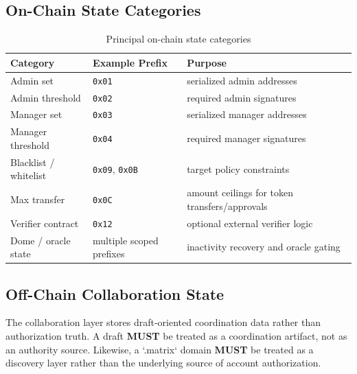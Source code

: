 \documentclass[11pt]{article}
\newcommand{\code}[1]{\texttt{#1}}
\newcommand{\must}{\textbf{MUST}}
\begin{document}
\subsection{On-Chain State Categories}
\begin{table}[h!]
  \centering
  \caption{Principal on-chain state categories}
  \begin{tabularx}{\textwidth}{>{\raggedright\arraybackslash}p{}>{\raggedright\arraybackslash}p{}X}
    \toprule
    Category & Example Prefix & Purpose \\
    \midrule
    Admin set & \code{0x01} & serialized admin addresses \\
    Admin threshold & \code{0x02} & required admin signatures \\
    Manager set & \code{0x03} & serialized manager addresses \\
    Manager threshold & \code{0x04} & required manager signatures \\
    Blacklist / whitelist & \code{0x09}, \code{0x0B} & target policy constraints \\
    Max transfer & \code{0x0C} & amount ceilings for token transfers/approvals \\
    Verifier contract & \code{0x12} & optional external verifier logic \\
    Dome / oracle state & multiple scoped prefixes & inactivity recovery and oracle gating \\
    \bottomrule
  \end{tabularx}
\end{table}

\subsection{Off-Chain Collaboration State}
The collaboration layer stores draft-oriented coordination data rather than authorization truth. A draft \must{} be treated as a coordination artifact, not as an authority source. Likewise, a `.matrix` domain \must{} be treated as a discovery layer rather than the underlying source of account authorization.
\end{document}
